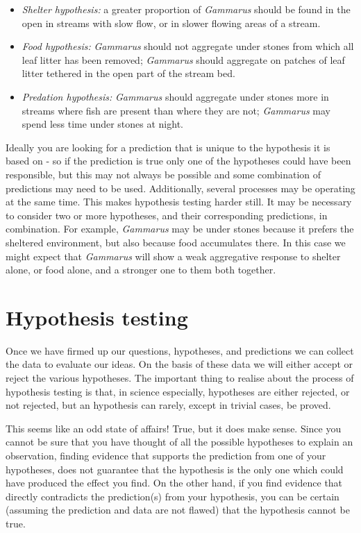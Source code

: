 \documentclass[]{book}
\begin{document}
\begin{itemize}
\item
  \emph{Shelter hypothesis:} a greater proportion of \emph{Gammarus}
  should be found in the open in streams with slow flow, or in slower
  flowing areas of a stream.
\item
  \emph{Food hypothesis:} \emph{Gammarus} should not aggregate under
  stones from which all leaf litter has been removed; \emph{Gammarus}
  should aggregate on patches of leaf litter tethered in the open part
  of the stream bed.
\item
  \emph{Predation hypothesis:} \emph{Gammarus} should aggregate under
  stones more in streams where fish are present than where they are not;
  \emph{Gammarus} may spend less time under stones at night.
\end{itemize}

Ideally you are looking for a prediction that is unique to the
hypothesis it is based on - so if the prediction is true only one of the
hypotheses could have been responsible, but this may not always be
possible and some combination of predictions may need to be used.
Additionally, several processes may be operating at the same time. This
makes hypothesis testing harder still. It may be necessary to consider
two or more hypotheses, and their corresponding predictions, in
combination. For example, \emph{Gammarus} may be under stones because it
prefers the sheltered environment, but also because food accumulates
there. In this case we might expect that \emph{Gammarus} will show a
weak aggregative response to shelter alone, or food alone, and a
stronger one to them both together.

\section{Hypothesis testing}\label{hypothesis-testing}

Once we have firmed up our questions, hypotheses, and predictions we can
collect the data to evaluate our ideas. On the basis of these data we
will either accept or reject the various hypotheses. The important thing
to realise about the process of hypothesis testing is that, in science
especially, hypotheses are either rejected, or not rejected, but an
hypothesis can rarely, except in trivial cases, be proved.

This seems like an odd state of affairs! True, but it does make sense.
Since you cannot be sure that you have thought of all the possible
hypotheses to explain an observation, finding evidence that supports the
prediction from one of your hypotheses, does not guarantee that the
hypothesis is the only one which could have produced the effect you
find. On the other hand, if you find evidence that directly contradicts
the prediction(s) from your hypothesis, you can be certain (assuming the
prediction and data are not flawed) that the hypothesis cannot be true.
\end{document}
